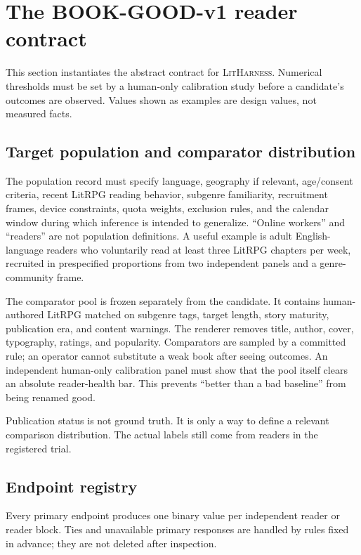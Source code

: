 \documentclass[11pt]{article}
\theoremstyle{remark}
\newcommand{\system}{\textsc{LitHarness}}
\begin{document}
\section{The BOOK-GOOD-v1 reader contract}

This section instantiates the abstract contract for \system. Numerical thresholds must be
set by a human-only calibration study before a candidate's outcomes are observed. Values
shown as examples are design values, not measured facts.

\subsection{Target population and comparator distribution}

The population record must specify language, geography if relevant, age/consent criteria,
recent LitRPG reading behavior, subgenre familiarity, recruitment frames, device constraints,
quota weights, exclusion rules, and the calendar window during which inference is intended
to generalize. ``Online workers'' and ``readers'' are not population definitions. A useful
example is adult English-language readers who voluntarily read at least three LitRPG
chapters per week, recruited in prespecified proportions from two independent panels and a
genre-community frame.

The comparator pool is frozen separately from the candidate. It contains human-authored
LitRPG matched on subgenre tags, target length, story maturity, publication era, and content
warnings. The renderer removes title, author, cover, typography, ratings, and popularity.
Comparators are sampled by a committed rule; an operator cannot substitute a weak book after
seeing outcomes. An independent human-only calibration panel must show that the pool itself
clears an absolute reader-health bar. This prevents ``better than a bad baseline'' from being
renamed good.

Publication status is not ground truth. It is only a way to define a relevant comparison
distribution. The actual labels still come from readers in the registered trial.

\subsection{Endpoint registry}

Every primary endpoint produces one binary value per independent reader or reader block.
Ties and unavailable primary responses are handled by rules fixed in advance; they are not
deleted after inspection.
\end{document}
